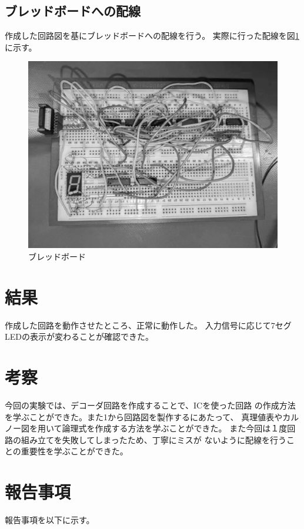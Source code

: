 \documentclass[a4paper,11pt,dvipdfmx]{jsarticle}
\begin{document}
\subsection{ブレッドボードへの配線}
作成した回路図を基にブレッドボードへの配線を行う。
実際に行った配線を図\ref{fig:haisen}に示す。
\begin{figure}[h]
  \centering
  \includegraphics[width=15cm]{./images/haisen_gray.jpg}
  \caption{ブレッドボード}
  \label{fig:haisen}
\end{figure}

\section{結果}
作成した回路を動作させたところ、正常に動作した。
入力信号に応じて7セグLEDの表示が変わることが確認できた。

\section{考察}
今回の実験では、デコーダ回路を作成することで、ICを使った回路
の作成方法を学ぶことができた。また1から回路図を製作するにあたって、
真理値表やカルノー図を用いて論理式を作成する方法を学ぶことができた。
また今回は１度回路の組み立てを失敗してしまったため、丁寧にミスが
ないように配線を行うことの重要性を学ぶことができた。


\section{報告事項}
報告事項を以下に示す。
\end{document}
